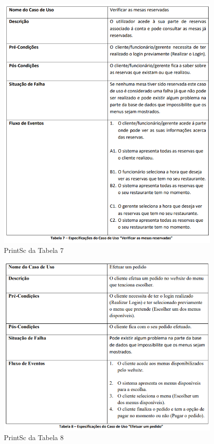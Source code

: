 \FloatBarrier
\begin{figure}[!hbt]
    \centering
    \includegraphics[width=14cm]{Resources/TablesPrintSc/7.png}
    \caption{PrintSc da Tabela 7}
    
\end{figure}
\FloatBarrier
\begin{figure}[!hbt]
    \centering
    \includegraphics[width=14cm]{Resources/TablesPrintSc/8.png}
    \caption{PrintSc da Tabela 8}
    
\end{figure}
